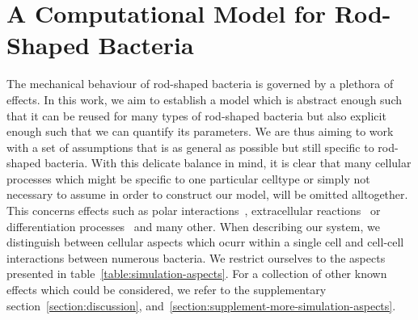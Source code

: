 \documentclass{article}
\begin{document}
\section{A Computational Model for Rod-Shaped Bacteria}
\label{sec:computational-model}

The mechanical behaviour of rod-shaped bacteria is governed by a plethora of effects.
In this work, we aim to establish a model which is abstract enough such that it can be reused for
many types of rod-shaped bacteria but also explicit enough such that we can quantify its parameters.
We are thus aiming to work with a set of assumptions that is as general as possible but still
specific to rod-shaped bacteria.
With this delicate balance in mind, it is clear that many cellular processes which might be specific
to one particular celltype or simply not necessary to assume in order to construct our model, will
be omitted alltogether.
This concerns effects such as polar interactions~\cite{Duvernoy2018}, extracellular
reactions~\cite{Wang2010} or differentiation processes~\cite{vanGestel2015,Lpez2010} and many other.
When describing our system, we distinguish between cellular aspects which ocurr within a single
cell and cell-cell interactions between numerous bacteria.
We restrict ourselves to the aspects presented in table~\ref{table:simulation-aspects}.
For a collection of other known effects which could be considered, we refer to the supplementary
section~\ref{section:discussion}, and~\ref{section:supplement-more-simulation-aspects}.
\end{document}
